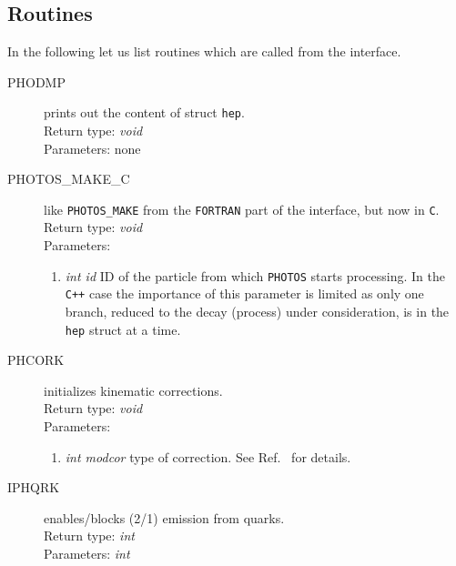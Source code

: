 \documentclass[]{Photos_interface_design}
\begin{document}
\subsection{Routines}

In the following let us list routines which are called from the interface.

\begin{description}
\item[PHODMP] prints out the content of struct {\tt hep}. \\
  Return type: \textit{void} \\
  Parameters: none
\end{description}

\begin{description}
\item[PHOTOS\_MAKE\_C]  like {\tt PHOTOS\_MAKE} from the {\tt FORTRAN} part of the interface, but now in {\tt C}. \\
  Return type: \textit{void} \\
  Parameters:
  \begin{enumerate}
    \item \textit {int id} ID of the particle from which {\tt PHOTOS} starts 
processing. In the {\tt C++} case the importance of this parameter is limited 
as only one branch, reduced to the decay (process)  under consideration,  is in the {\tt hep} struct at a time. 
  \end{enumerate}
\end{description}

\begin{description}
\item[PHCORK] initializes kinematic corrections. \\
  Return type: \textit{void} \\
  Parameters:
  \begin{enumerate}
    \item \textit {int modcor} type of correction. See Ref.~\cite{Golonka:2005pn}  for details.
  \end{enumerate}
\end{description}


\begin{description}
\item[IPHQRK] enables/blocks (2/1) emission from quarks. \\
  Return type: \textit{int} \\
  Parameters: \textit{int}
\end{description}
\end{document}
